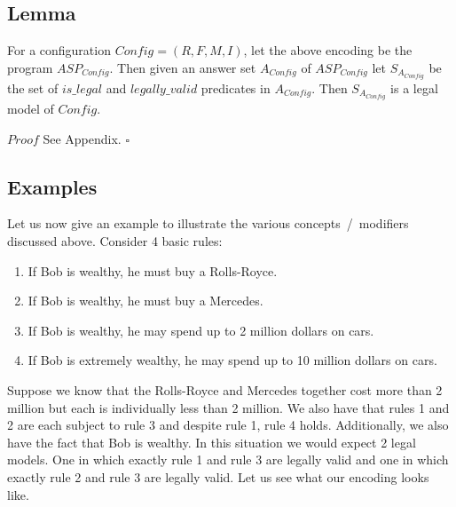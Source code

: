 \subsection{Lemma}
For a configuration $Config=(R,F,M,I)$, let the above encoding be the program $ASP_{Config}$. Then given an answer set $A_{Config}$ of $ASP_{Config}$ let $S_{A_{Config}}$ be the set of $is\_legal$ and $legally\_valid$ predicates in $A_{Config}$. Then $S_{A_{Config}}$ is a legal model of $Config$.    

$Proof$ See Appendix. $\square$


\subsection{Examples}
Let us now give an example to illustrate the various concepts~/~modifiers discussed above.
Consider 4 basic rules:
\begin{enumerate}
  \item If Bob is wealthy, he must buy a Rolls-Royce.
  \item If Bob is wealthy, he must buy a Mercedes.
  \item If Bob is wealthy, he may spend up to 2 million dollars on cars.
  \item If Bob is extremely wealthy, he may spend up to 10 million dollars on cars.
\end{enumerate}
Suppose we know that the Rolls-Royce and Mercedes together cost more
than 2 million but each is individually less than 2 million. We also
have that rules 1 and 2 are each subject to rule 3 and despite rule 1,
rule 4 holds. Additionally, we also have the fact that Bob is
wealthy. In this situation we would expect 2 legal models. One in which
exactly rule 1 and rule 3 are legally valid and one in which exactly
rule 2 and rule 3 are legally valid. Let us see what our encoding
looks like.
